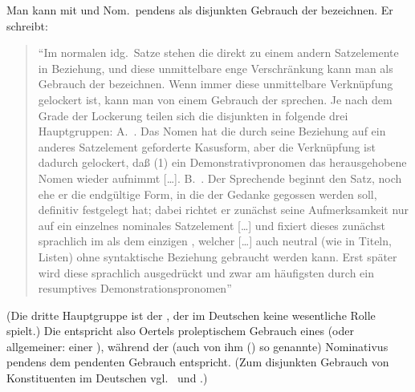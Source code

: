 \documentclass[output=paper]{langsci/langscibook}
\begin{document}
Man kann mit \citet{Oertel1923}  und Nom.\ pendens als disjunkten
Gebrauch der  bezeichnen. Er schreibt:
\begin{quotation}
"`Im normalen idg.\ Satze stehen die  direkt zu einem andern Satzelemente in Beziehung, und diese unmittelbare enge Verschränkung kann man
als  Gebrauch der  bezeichnen. Wenn immer diese unmittelbare Verknüpfung gelockert ist, kann man von einem  
Gebrauch der  sprechen. Je nach dem Grade der Lockerung teilen sich
die disjunkten  in folgende drei Hauptgruppen: A.\ . Das Nomen hat die durch seine Beziehung auf ein anderes Satzelement geforderte Kasusform, aber die Verknüpfung ist dadurch gelockert,
daß (1) ein Demonstrativpronomen das herausgehobene Nomen wieder aufnimmt [\ldots]. B.\ . Der Sprechende beginnt den Satz, noch
ehe er die endgültige Form, in die der Gedanke gegossen werden soll, definitiv festgelegt hat; dabei richtet er zunächst seine Aufmerksamkeit nur auf
ein einzelnes nominales Satzelement [\ldots] und fixiert dieses zunächst sprachlich im  als dem einzigen , welcher [\ldots] auch neutral (wie in
Titeln, Listen) ohne syntaktische Beziehung gebraucht werden kann. Erst
später wird diese sprachlich ausgedrückt und zwar am häufigsten durch ein
resumptives Demonstrationspronomen"' \citep[45]{Oertel1923}
\end{quotation}
(Die dritte Hauptgruppe ist der , der im Deutschen keine wesentliche Rolle spielt.) Die  entspricht also Oertels proleptischem Gebrauch eines  (oder allgemeiner: einer ), während der (auch von
ihm (\citeyear[48]{Oertel1923}) so genannte) Nominativus pendens dem pendenten Gebrauch entspricht. (Zum disjunkten Gebrauch von Konstituenten im Deutschen vgl.\ \citet{Altmann1979} und \citet{Vat1980}.)
\end{document}

